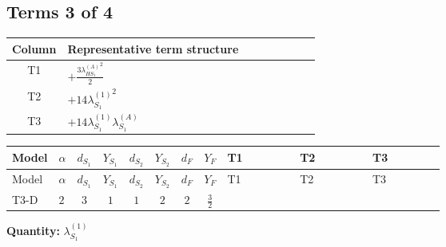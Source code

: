 \documentclass[8pt]{article}
\begin{document}
\begin{landscape}
\subsection*{Terms 3 of 4}
\begin{center}
\begin{tabular}{@{}c >{\raggedright\arraybackslash}p{0.82\linewidth}@{}}
\toprule
Column & Representative term structure \\
\midrule
T1 & \(\displaystyle +\frac{3 {\lambda_{HS_1}^{(A)}}^2}{2}\) \\
\midrule
T2 & \(\displaystyle +14 {\lambda_{S_1}^{(1)}}^2\) \\
\midrule
T3 & \(\displaystyle +14 {\lambda_{S_1}^{(1)}} {\lambda_{S_1}^{(A)}}\) \\
\midrule
\bottomrule
\end{tabular}
\end{center}
\smallskip
\tiny
\begin{longtable}{@{}llcccccc >{\raggedright\arraybackslash}p{0.21\linewidth} >{\raggedright\arraybackslash}p{0.21\linewidth} >{\raggedright\arraybackslash}p{0.21\linewidth}@{}}
\toprule
Model & $\alpha$ & $d_{S_1}$ & $Y_{S_1}$ & $d_{S_2}$ & $Y_{S_2}$ & $d_F$ & $Y_F$ & T1 & T2 & T3 \\
\midrule
\endfirsthead
\toprule
Model & $\alpha$ & $d_{S_1}$ & $Y_{S_1}$ & $d_{S_2}$ & $Y_{S_2}$ & $d_F$ & $Y_F$ & T1 & T2 & T3 \\
\midrule
\endhead
T3-D & $2$ & $3$ & $1$ & $1$ & $2$ & $2$ & $\frac{3}{2}$ & \scriptsize\adjustbox{max width=\linewidth}{$\begin{gathered} +\frac{3 {\lambda_{HS_1}^{(A)}}^2}{2}\end{gathered}$} & \scriptsize\adjustbox{max width=\linewidth}{$\begin{gathered} +14 {\lambda_{S_1}^{(1)}}^2\end{gathered}$} & \scriptsize\adjustbox{max width=\linewidth}{$\begin{gathered} +14 {\lambda_{S_1}^{(1)}} {\lambda_{S_1}^{(A)}}\end{gathered}$} \\
\midrule
\bottomrule
\end{longtable}
\clearpage
\noindent\textbf{Quantity: }$\lambda_{S_1}^{(1)}$\par\smallskip

\end{landscape}
\end{document}
